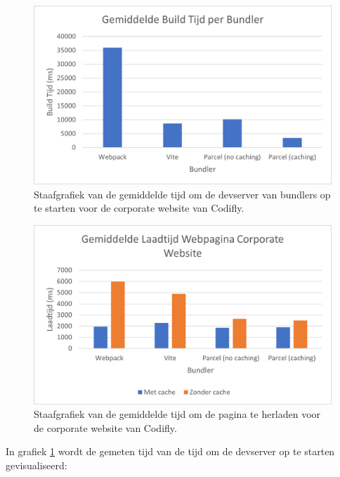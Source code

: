\begin{figure}[!htp]
  \includegraphics[width=\linewidth]{bachproef/img/results-corporate.png}
  \caption{Staafgrafiek van de gemiddelde tijd om de devserver van bundlers op te starten voor de corporate website van Codifly.}
  \label{fig:Corporateresults}
\end{figure}

\begin{figure}[!htp]
  \includegraphics[width=\linewidth]{bachproef/img/results-corporate-load.png}
  \caption{Staafgrafiek van de gemiddelde tijd om de pagina te herladen voor de corporate website van Codifly.}
  \label{fig:Corporateresultsloadtimes}
\end{figure}

In grafiek \ref{fig:Corporateresults} wordt de gemeten tijd van de tijd om de devserver op te starten gevisualiseerd:

